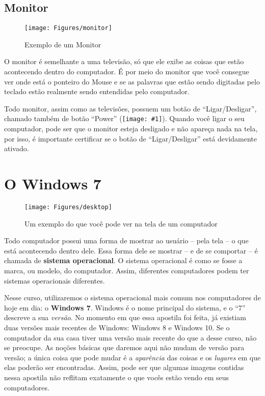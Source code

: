 \documentclass[hidelinks,12pt]{article}
\newcommand{\icon}[1]{\texttt{[image: \#1]}}
\begin{document}
\subsection{Monitor}

\begin{figure}[!h]
        \centering
		\texttt{[image: Figures/monitor]}
		\label{fig:monitor}
		\caption{Exemplo de um Monitor}
\end{figure}

O monitor é semelhante a uma televisão, só que ele exibe as coisas que estão acontecendo dentro do computador. É por meio do monitor que você consegue ver onde está o ponteiro do Mouse e se as palavras que estão sendo digitadas pelo teclado estão realmente sendo entendidas pelo computador.

Todo monitor, assim como as televisões, possuem um botão de ``Ligar/Desligar'', chamado também de botão ``Power'' (\icon{Figures/power}). Quando você ligar o seu computador, pode ser que o monitor esteja desligado e não apareça nada na tela, por isso, é importante certificar se o botão de ``Ligar/Desligar'' está devidamente ativado.


\section{O Windows 7}

\begin{figure}[!h]
	\centering
	\texttt{[image: Figures/desktop]}
	\caption{Um exemplo do que você pode ver na tela de um computador}
	\label{fig:desktop}
\end{figure}

Todo computador possui uma forma de mostrar ao usuário – pela tela – o que está acontecendo dentro dele. Essa forma dele se mostrar – e de se comportar – é chamada de \textbf{sistema operacional}. O sistema operacional é como se fosse a marca, ou modelo, do computador. Assim, diferentes computadores podem ter sistemas operacionais diferentes.

Nesse curso, utilizaremos o sistema operacional mais comum nos computadores de hoje em dia: o \textbf{Windows 7}. Windows é o nome principal do sistema, e o ``7'' descreve a sua \textit{versão}. No momento em que essa apostila foi feita, já existiam duas versões mais recentes de Windows: Windows 8 e Windows 10. Se o computador da sua casa tiver uma versão mais recente do que a desse curso, não se preocupe. As noções básicas que daremos aqui não mudam de versão para versão; a única coisa que pode mudar é a \textit{aparência} das coisas e os \textit{lugares} em que elas poderão ser encontradas. Assim, pode ser que algumas imagens contidas nessa apostila não reflitam exatamente o que vocês estão vendo em seus computadores. 
\end{document}
